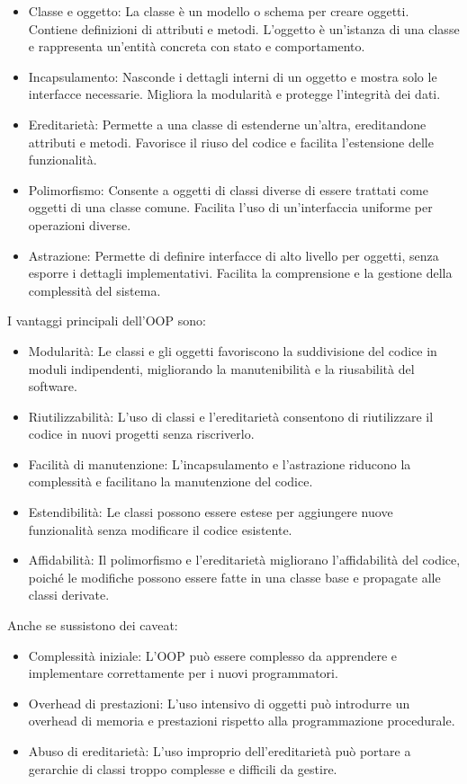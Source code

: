 \documentclass[
  letterpaper,
  DIV=11,
  numbers=noendperiod]{scrreprt}
\providecommand{\tightlist}{%
  \setlength{\itemsep}{0pt}\setlength{\parskip}{0pt}}\usepackage{longtable,booktabs,array}
\begin{document}
\begin{itemize}
\tightlist
\item
  Classe e oggetto: La classe è un modello o schema per creare oggetti.
  Contiene definizioni di attributi e metodi. L'oggetto è un'istanza di
  una classe e rappresenta un'entità concreta con stato e comportamento.
\item
  Incapsulamento: Nasconde i dettagli interni di un oggetto e mostra
  solo le interfacce necessarie. Migliora la modularità e protegge
  l'integrità dei dati.
\item
  Ereditarietà: Permette a una classe di estenderne un'altra,
  ereditandone attributi e metodi. Favorisce il riuso del codice e
  facilita l'estensione delle funzionalità.
\item
  Polimorfismo: Consente a oggetti di classi diverse di essere trattati
  come oggetti di una classe comune. Facilita l'uso di un'interfaccia
  uniforme per operazioni diverse.
\item
  Astrazione: Permette di definire interfacce di alto livello per
  oggetti, senza esporre i dettagli implementativi. Facilita la
  comprensione e la gestione della complessità del sistema.
\end{itemize}

I vantaggi principali dell'OOP sono:

\begin{itemize}
\tightlist
\item
  Modularità: Le classi e gli oggetti favoriscono la suddivisione del
  codice in moduli indipendenti, migliorando la manutenibilità e la
  riusabilità del software.
\item
  Riutilizzabilità: L'uso di classi e l'ereditarietà consentono di
  riutilizzare il codice in nuovi progetti senza riscriverlo.
\item
  Facilità di manutenzione: L'incapsulamento e l'astrazione riducono la
  complessità e facilitano la manutenzione del codice.
\item
  Estendibilità: Le classi possono essere estese per aggiungere nuove
  funzionalità senza modificare il codice esistente.
\item
  Affidabilità: Il polimorfismo e l'ereditarietà migliorano
  l'affidabilità del codice, poiché le modifiche possono essere fatte in
  una classe base e propagate alle classi derivate.
\end{itemize}

Anche se sussistono dei caveat:

\begin{itemize}
\tightlist
\item
  Complessità iniziale: L'OOP può essere complesso da apprendere e
  implementare correttamente per i nuovi programmatori.
\item
  Overhead di prestazioni: L'uso intensivo di oggetti può introdurre un
  overhead di memoria e prestazioni rispetto alla programmazione
  procedurale.
\item
  Abuso di ereditarietà: L'uso improprio dell'ereditarietà può portare a
  gerarchie di classi troppo complesse e difficili da gestire.
\end{itemize}
\end{document}
